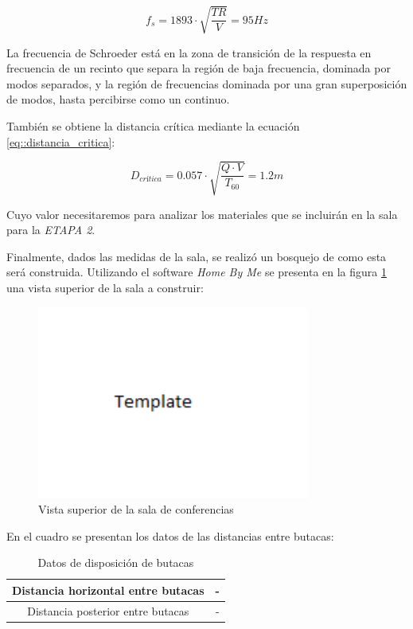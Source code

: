 \begin{equation}
    f_s = 1893 \cdot \sqrt{\frac{TR}{V}} = 95Hz
    \label{eq::freq_schroeder}
\end{equation}

\par La frecuencia de Schroeder está en la zona de transición de la respuesta en frecuencia de un recinto que separa la región de baja frecuencia, dominada por modos separados, y la región de frecuencias dominada por una gran superposición de modos, hasta percibirse como un continuo.

\par También se obtiene la distancia crítica mediante la ecuación \ref{eq::distancia_critica}:

\begin{equation}
    D_{crítica} = 0.057 \cdot \sqrt{ \frac{Q \cdot V}{T_{60}}}= 1.2m
    \label{eq::distancia_critica}
\end{equation}

\par Cuyo valor necesitaremos para analizar los materiales que se incluirán en la sala para la \textit{ETAPA 2}.\\

\par Finalmente, dados las medidas de la sala, se realizó un bosquejo de como esta será construida. Utilizando el software \textit{Home By Me} se presenta en la figura \ref{fig:vista_sup_sala} una vista superior de la sala a construir:

\begin{figure}[H]
	\centering
	\includegraphics[width=0.8\textwidth]{./img/sala.png}
	\caption{Vista superior de la sala de conferencias}
	\label{fig:vista_sup_sala}
\end{figure}

\par En el cuadro se presentan los datos de las distancias entre butacas:

\begin{table}
    \centering
    \begin{tabular}{|c|c|} \hline
        Distancia horizontal entre butacas & -  \\ \hline
        Distancia posterior entre butacas  & -  \\ \hline
    \end{tabular}
    \caption{Datos de disposición de butacas}
    \label{tab:my_label}
\end{table}
